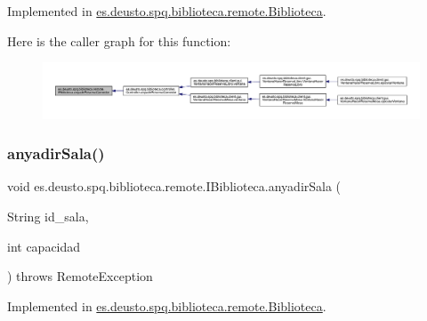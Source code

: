 Implemented in \mbox{\hyperlink{classes_1_1deusto_1_1spq_1_1biblioteca_1_1remote_1_1_biblioteca_ad02d14595454dd0b8e8ef7db97b673f6}{es.\+deusto.\+spq.\+biblioteca.\+remote.\+Biblioteca}}.

Here is the caller graph for this function\+:
\nopagebreak
\begin{figure}[H]
\begin{center}
\leavevmode
\includegraphics[width=350pt]{interfacees_1_1deusto_1_1spq_1_1biblioteca_1_1remote_1_1_i_biblioteca_a6e1aadce8e2f541702117bf54ed6a225_icgraph}
\end{center}
\end{figure}
\mbox{\label{interfacees_1_1deusto_1_1spq_1_1biblioteca_1_1remote_1_1_i_biblioteca_a3f32377ccce2450ce8154902b470bf5b}} 
\subsubsection{\texorpdfstring{anyadir\+Sala()}{anyadirSala()}}
{\footnotesize\ttfamily void es.\+deusto.\+spq.\+biblioteca.\+remote.\+I\+Biblioteca.\+anyadir\+Sala (\begin{DoxyParamCaption}\item[{String}]{id\+\_\+sala,  }\item[{int}]{capacidad }\end{DoxyParamCaption}) throws Remote\+Exception}



Implemented in \mbox{\hyperlink{classes_1_1deusto_1_1spq_1_1biblioteca_1_1remote_1_1_biblioteca_ada19ff59e03ece674f64ac191ba87c29}{es.\+deusto.\+spq.\+biblioteca.\+remote.\+Biblioteca}}.

